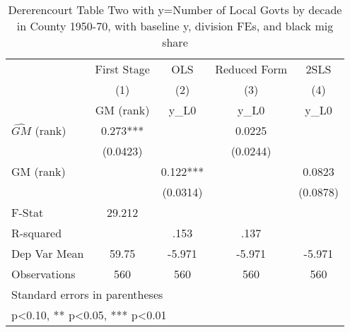 \begin{table}[htbp]\centering
\def\sym#1{\ifmmode^{#1}\else\(^{#1}\)\fi}
\caption{Dererencourt Table Two with y=Number of Local Govts by decade in County 1950-70, with baseline y, division FEs, and black mig share}
\begin{tabular}{l*{4}{c}}
\toprule
                    & First Stage   &         OLS   &Reduced Form   &        2SLS   \\
                    &\multicolumn{1}{c}{(1)}&\multicolumn{1}{c}{(2)}&\multicolumn{1}{c}{(3)}&\multicolumn{1}{c}{(4)}\\
                    &\multicolumn{1}{c}{GM  (rank)}&\multicolumn{1}{c}{y\_L0}&\multicolumn{1}{c}{y\_L0}&\multicolumn{1}{c}{y\_L0}\\
\midrule
$\hat{GM}$ (rank)   &       0.273***&               &      0.0225   &               \\
                    &    (0.0423)   &               &    (0.0244)   &               \\
\addlinespace
GM  (rank)          &               &       0.122***&               &      0.0823   \\
                    &               &    (0.0314)   &               &    (0.0878)   \\
\midrule
F-Stat              &      29.212   &               &               &               \\
R-squared           &               &        .153   &        .137   &               \\
Dep Var Mean        &       59.75   &      -5.971   &      -5.971   &      -5.971   \\
Observations        &         560   &         560   &         560   &         560   \\
\bottomrule
\multicolumn{5}{l}{\footnotesize Standard errors in parentheses}\\
\multicolumn{5}{l}{\footnotesize * p<0.10, ** p<0.05, *** p<0.01}\\
\end{tabular}
\end{table}
